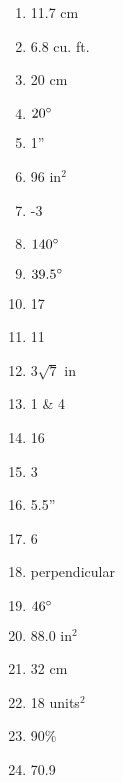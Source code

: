 \documentclass[../uilmath.tex]{subfiles}
\begin{document}
\begin{enumerate}[label=\bfseries\arabic*.]
    \item %
    11.7 cm 

    \item %
    6.8 cu. ft. 

    \item %
    20 cm

    \item %
    $20\degree$

    \item %
    1''

    \item %
    96 in$^2$

    \item %
    -3

    \item %
    $140\degree$

    \item %
    $39.5\degree$

    \item %
    17

    \item %
    11

    \item %
    $3\sqrt{7}$ in 

    \item %
    1 \& 4 

    \item %
    16

    \item %
    3

    \item %
    5.5''

    \item %
    6

    \item %
    perpendicular
    
    \item %
    $46\degree$

    \item %
    88.0 in$^2$

    \item %
    32 cm 

    \item %
    18 units$^2$

    \item %
    90\%

    \item %
    70.9


\end{enumerate}
\end{document}
